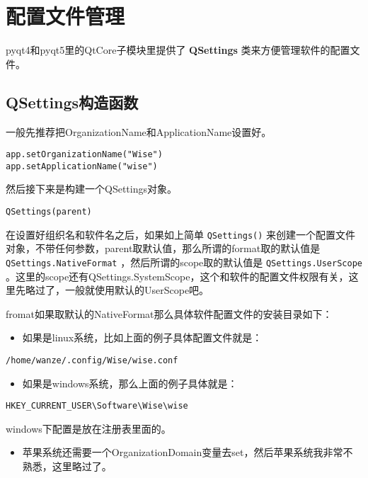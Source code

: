 \documentclass[11pt,oneside]{article}
\begin{document}
\section{配置文件管理}
\label{sec:orgheadline33}
pyqt4和pyqt5里的QtCore子模块里提供了 \textbf{QSettings} 类来方便管理软件的配置文件。

\subsection{QSettings构造函数}
\label{sec:orgheadline27}
一般先推荐把OrganizationName和ApplicationName设置好。

\begin{verbatim}
app.setOrganizationName("Wise")
app.setApplicationName("wise")
\end{verbatim}


然后接下来是构建一个QSettings对象。
\begin{verbatim}
QSettings(parent)
\end{verbatim}

在设置好组织名和软件名之后，如果如上简单 \texttt{QSettings()} 来创建一个配置文件对象，不带任何参数，parent取默认值，那么所谓的format取的默认值是 \texttt{QSettings.NativeFormat} ，然后所谓的scope取的默认值是 \texttt{QSettings.UserScope} 。这里的scope还有QSettings.SystemScope，这个和软件的配置文件权限有关，这里先略过了，一般就使用默认的UserScope吧。

fromat如果取默认的NativeFormat那么具体软件配置文件的安装目录如下：

\begin{itemize}
\item 如果是linux系统，比如上面的例子具体配置文件就是：
\end{itemize}
\begin{Verbatim}
/home/wanze/.config/Wise/wise.conf
\end{Verbatim}

\begin{itemize}
\item 如果是windows系统，那么上面的例子具体就是：
\end{itemize}
\begin{Verbatim}
HKEY_CURRENT_USER\Software\Wise\wise
\end{Verbatim}

windows下配置是放在注册表里面的。

\begin{itemize}
\item 苹果系统还需要一个OrganizationDomain变量去set，然后苹果系统我非常不熟悉，这里略过了。
\end{itemize}
\end{document}
